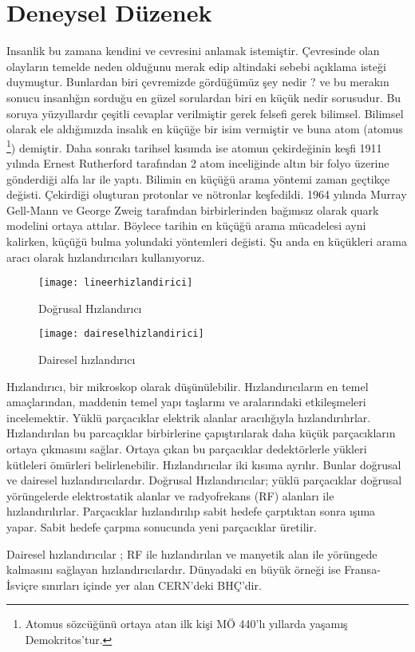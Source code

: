 \chapter{Deneysel Düzenek}
Insanlik bu zamana kendini ve cevresini anlamak istemiştir. Çevresinde olan olayların temelde neden olduğunu merak edip altindaki sebebi açıklama isteği duymuştur. Bunlardan biri çevremizde gördüğümüz şey nedir ? ve bu merakın sonucu insanlığın sorduğu en güzel sorulardan biri en küçük nedir sorusudur. Bu soruya yüzyıllardır çeşitli cevaplar verilmiştir gerek felsefi gerek bilimsel. Bilimsel olarak ele aldığımızda insalık en küçüğe bir isim vermiştir ve buna atom (atomus \footnote{Atomus sözcüğünü ortaya atan ilk kişi MÖ 440'lı yıllarda yaşamış Demokritos'tur.}) demiştir. Daha sonrakı tarihsel kısımda ise atomun çekirdeğinin keşfi 1911 yılında Ernest Rutherford tarafından 2 atom inceliğinde altın bir folyo üzerine gönderdiği alfa lar ile yaptı. Bilimin en küçüğü arama yöntemi zaman geçtikçe değisti. Çekirdiği oluşturan protonlar ve nötronlar keşfedildi. 1964 yılında Murray Gell-Mann ve George Zweig tarafından birbirlerinden bağımsız olarak quark modelini ortaya attılar. Böylece tarihin en küçüğü arama mücadelesi ayni kalirken, küçüğü bulma yolundaki yöntemleri değisti. Şu anda en küçükleri arama aracı olarak hızlandırıcıları kullanıyoruz.\\
\begin{figure}[!htpb]
  \centering
  \begin{minipage}[b]{0.4\textwidth}
    \texttt{[image: lineerhizlandirici]}
    \caption{Doğrusal Hızlandırıcı}
  \end{minipage}
  \hfill
  \begin{minipage}[b]{0.4\textwidth}
    \texttt{[image: daireselhizlandirici]}
    \caption{Dairesel hızlandırıcı}
  \end{minipage}
\end{figure}
\par Hızlandırıcı, bir mikroskop olarak düşünülebilir. Hızlandırıcıların en temel amaçlarından, maddenin temel yapı taşlarını ve aralarındaki etkileşmeleri incelemektir. Yüklü parçacıklar elektrik alanlar aracılığıyla hızlandırılırlar. Hızlandırılan bu parcaçıklar birbirlerine çapıştırılarak daha küçük parçacıkların ortaya çıkmasını sağlar. Ortaya çıkan bu parçacıklar dedektörlerle yükleri kütleleri ömürleri belirlenebilir. Hızlandırıcılar iki kısıma ayrılır. Bunlar doğrusal ve dairesel hızlandırıcılardır. Doğrusal Hızlandırıcılar; yüklü parçacıklar doğrusal yörüngelerde elektrostatik alanlar ve radyofrekans (RF) alanları ile hızlandırılırlar. Parçacıklar hızlandırılıp sabit hedefe çarptıktan sonra ışıma yapar. Sabit hedefe çarpma sonucunda yeni parçacıklar üretilir. \par
Dairesel hızlandırıcılar ; RF ile hızlandırılan ve manyetik alan ile yörüngede kalmasını sağlayan hızlandırıcılardır. Dünyadaki en büyük örneği ise Fransa-İsviçre sınırları içinde yer alan CERN'deki BHÇ'dir. \\





